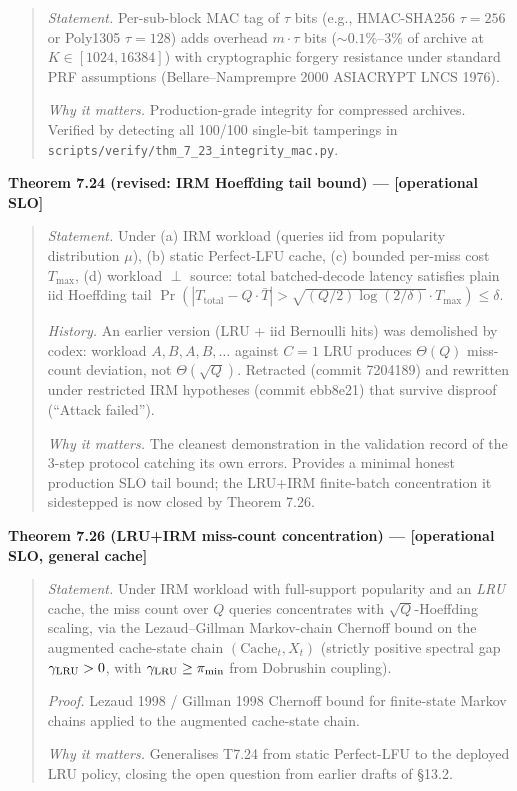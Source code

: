 \documentclass[
]{article}
\begin{document}
\begin{quote}
\emph{Statement.} Per-sub-block MAC tag of $\tau$ bits (e.g., HMAC-SHA256
$\tau=256$ or Poly1305 $\tau=128$) adds overhead $m \cdot \tau$ bits
($\sim 0.1\%$--3\% of archive at $K \in [1024, 16384]$) with
cryptographic forgery resistance under standard PRF assumptions
(Bellare--Namprempre 2000 ASIACRYPT LNCS 1976).

\emph{Why it matters.} Production-grade integrity for compressed
archives. Verified by detecting all 100/100 single-bit tamperings
in \texttt{scripts/verify/thm\_7\_23\_integrity\_mac.py}.
\end{quote}

\textbf{Theorem 7.24 (revised: IRM Hoeffding tail bound) ---
{[}operational SLO{]}}

\begin{quote}
\emph{Statement.} Under (a) IRM workload (queries iid from popularity
distribution $\mu$), (b) static Perfect-LFU cache, (c) bounded per-miss
cost $T_{\max}$, (d) workload $\perp$ source: total batched-decode
latency satisfies plain iid Hoeffding tail
$\Pr(|T_{\mathrm{total}} - Q \cdot \bar T| > \sqrt{(Q/2)\log(2/\delta)} \cdot T_{\max}) \leq \delta$.

\emph{History.} An earlier version (LRU + iid Bernoulli hits) was
demolished by codex: workload $A,B,A,B,\ldots$ against $C=1$ LRU
produces $\Theta(Q)$ miss-count deviation, not $\Theta(\sqrt{Q})$.
Retracted (commit 7204189) and rewritten under restricted IRM
hypotheses (commit ebb8e21) that survive disproof (``Attack failed'').

\emph{Why it matters.} The cleanest demonstration in the validation
record of the 3-step protocol catching its own errors. Provides a
minimal honest production SLO tail bound; the LRU+IRM finite-batch
concentration it sidestepped is now closed by Theorem 7.26.
\end{quote}

\textbf{Theorem 7.26 (LRU+IRM miss-count concentration) ---
{[}operational SLO, general cache{]}}

\begin{quote}
\emph{Statement.} Under IRM workload with full-support popularity and
an \emph{LRU} cache, the miss count over $Q$ queries concentrates with
$\sqrt{Q}$-Hoeffding scaling, via the Lezaud--Gillman Markov-chain
Chernoff bound on the augmented cache-state chain
$(\mathrm{Cache}_t, X_t)$ (strictly positive spectral gap
$\gamma_{\rm LRU} > 0$, with $\gamma_{\rm LRU} \geq \pi_{\min}$ from
Dobrushin coupling).

\emph{Proof.} Lezaud 1998 / Gillman 1998 Chernoff bound for
finite-state Markov chains applied to the augmented cache-state chain.

\emph{Why it matters.} Generalises T7.24 from static Perfect-LFU to
the deployed LRU policy, closing the open question from earlier drafts
of §13.2.
\end{quote}
\end{document}
